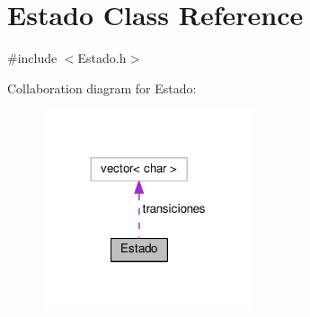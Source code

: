 \hypertarget{classEstado}{}\section{Estado Class Reference}
\label{classEstado}


{\ttfamily \#include $<$Estado.\+h$>$}



Collaboration diagram for Estado\+:
\nopagebreak
\begin{figure}[H]
\begin{center}
\leavevmode
\includegraphics[width=176pt]{classEstado__coll__graph}
\end{center}
\end{figure}

